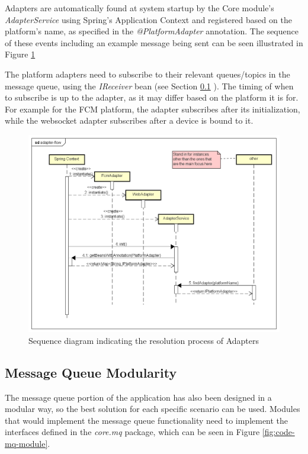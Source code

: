 Adapters are automatically found at system startup by the Core module's \textit{AdapterService} using Spring's Application Context and registered based on the platform's name, as specified in the \textit{@PlatformAdapter} annotation. The sequence of these events including an example message being sent can be seen illustrated in Figure \ref{fig:adapter-flow}

The platform adapters need to subscribe to their relevant queues/topics in the message queue, using the \textit{IReceiver} bean (see Section \ref{design:mq-modularity} ). The timing of when to subscribe is up to the adapter, as it may differ based on the platform it is for. For example for the FCM platform, the adapter subscribes after its initialization, while the websocket adapter subscribes after a device is bound to it.

\begin{figure}[!ht]
	\centering
	\includegraphics[width=1\textwidth]{figures/03_design/adapter-flow}
    \caption{Sequence diagram indicating the resolution process of Adapters}
    \label{fig:adapter-flow}
\end{figure}

\clearpage

\subsection{Message Queue Modularity} \label{design:mq-modularity}
The message queue portion of the application has also been designed in a modular way, so the best solution for each specific scenario can be used. Modules that would implement the message queue functionality need to implement the interfaces defined in the \textit{core.mq} package, which can be seen in Figure \ref{fig:code-mq-module}.

